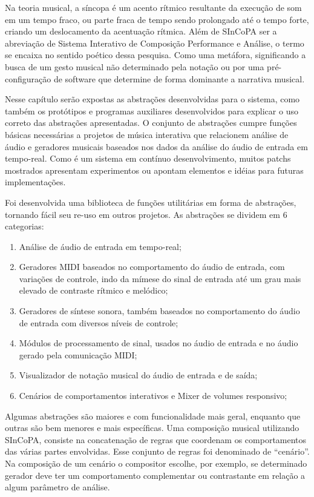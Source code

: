 \documentclass{ppgmus}
\begin{document}
Na teoria musical, a síncopa é um acento rítmico resultante da execução de som em um tempo fraco, 
ou parte fraca de tempo sendo prolongado até o tempo forte, criando um deslocamento da acentuação rítmica. 
Além de SInCoPA ser a abreviação de Sistema Interativo de Composição Performance e Análise, o termo se encaixa
no sentido poético dessa pesquisa. Como uma metáfora, significando a busca de um gesto musical não determinado pela notação
ou por uma pré-configuração de software que determine de forma dominante a narrativa musical.

  Nesse capítulo serão expostas as abstrações desenvolvidas para o sistema, como também
os protótipos e programas auxiliares desenvolvidos para explicar o uso correto das 
abstrações apresentadas. O conjunto de abstrações cumpre funções básicas necessárias
a projetos de música interativa que relacionem análise de áudio e geradores musicais
baseados nos dados da análise do áudio de entrada em tempo-real. Como é um sistema 
em contínuo desenvolvimento, muitos patchs mostrados apresentam experimentos ou apontam
elementos e idéias para futuras implementações.

  Foi desenvolvida uma biblioteca de funções utilitárias em forma de abstrações, 
tornando fácil seu re-uso em outros projetos. As abstrações se dividem em 6 categorias:

\begin{enumerate}
 \item Análise de áudio de entrada em tempo-real;
 \item Geradores MIDI baseados no comportamento do áudio de 
entrada, com variações de controle, indo da mímese do sinal de entrada
até um grau mais elevado de contraste rítmico e melódico;
 \item Geradores de síntese sonora, também baseados no comportamento
do áudio de entrada com diversos níveis de controle;
 \item Módulos de processamento de sinal, usados no áudio de entrada e no
áudio gerado pela comunicação MIDI;
 \item Visualizador de notação musical do áudio de entrada e de saída;
 \item Cenários de comportamentos interativos e Mixer de volumes responsivo;
 
\end{enumerate}

Algumas abstrações são maiores e com funcionalidade mais geral, enquanto
que outras são bem menores e mais específicas.
Uma composição musical utilizando SInCoPA, consiste na concatenação de
regras que coordenam os comportamentos das várias partes envolvidas.
Esse conjunto de regras foi denominado de ``cenário''. Na composição
de um cenário o compositor escolhe, por exemplo,  se determinado gerador 
deve ter um comportamento complementar ou contrastante  em relação a algum
parâmetro de análise.
\end{document}
